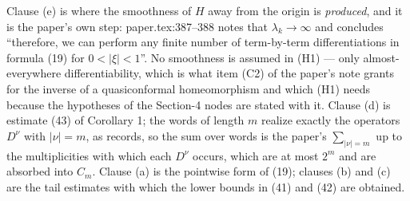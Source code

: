 \begin{lemma}
Clause (e) is where the smoothness of $H$ away from the origin is
\emph{produced}, and it is the paper's own step: paper.tex:387--388 notes that
$\lambda_k\to\infty$ and concludes ``therefore, we can perform any finite
number of term-by-term differentiations in formula (19) for $0<|\xi|<1$''.  No
smoothness is assumed in (H1) --- only almost-everywhere differentiability,
which is what item (C2) of the paper's note grants for the inverse of a
quasiconformal homeomorphism and which (H1) needs because the hypotheses of the
Section-4 nodes are stated with it.  Clause (d) is estimate (43) of Corollary 1; the words of length $m$ realize
exactly the operators $D^\nu$ with $|\nu|=m$, as  records,
so the sum over words is the paper's $\sum_{|\nu|=m}$ up to the multiplicities
with which each $D^\nu$ occurs, which are at most $2^m$ and are absorbed into
$C_m$.  Clause (a) is the pointwise form of (19); clauses (b) and (c) are the
tail estimates with which the lower bounds in (41) and (42) are obtained.
\end{lemma}
